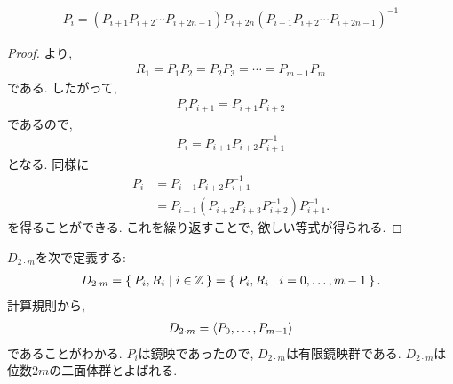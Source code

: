 \begin{lemma}
  \label{lem:i2m:conj}
  \begin{align*}
    P_i=(P_{i+1} P_{i+2}\cdots P_{i+2n-1}) P_{i+2n}(P_{i+1} P_{i+2}\cdots P_{i+2n-1})^{-1}
  \end{align*}
\end{lemma}
\begin{proof}
  より,
  \begin{align*}
    R_{1}=P_{1}P_{2}=P_{2}P_{3}=\cdots =P_{m-1}P_{m}
  \end{align*}
  である.  したがって,
  \begin{align*}
    P_{i}P_{i+1}=P_{i+1}P_{i+2}
  \end{align*}
  であるので,
  \begin{align*}
    P_{i}=P_{i+1}P_{i+2}P_{i+1}^{-1}
  \end{align*}  
となる. 同様に
  \begin{align*}
    P_{i}&=P_{i+1}P_{i+2}P_{i+1}^{-1}\\
    &=P_{i+1}(P_{i+2}P_{i+3}P_{i+2}^{-1})P_{i+1}^{-1}.
  \end{align*}
  を得ることができる. これを繰り返すことで, 欲しい等式が得られる.
\end{proof}
$D_{2\cdot m}$を次で定義する:
\begin{align*}
  D_{2\cdot m} = \Set{P_i,R_i|i\in \mathbb{Z}} = \Set{P_i,R_i|i=0,\ldots,m-1}.
\end{align*}
計算規則から,
\begin{align*}
   D_{2\cdot m} = \Braket{P_0,\ldots,P_{m-1}}
\end{align*}
であることがわかる.
$P_i$は鏡映であったので,
$D_{2\cdot m}$は有限鏡映群である.
$D_{2\cdot m}$は位数$2m$の二面体群とよばれる.

